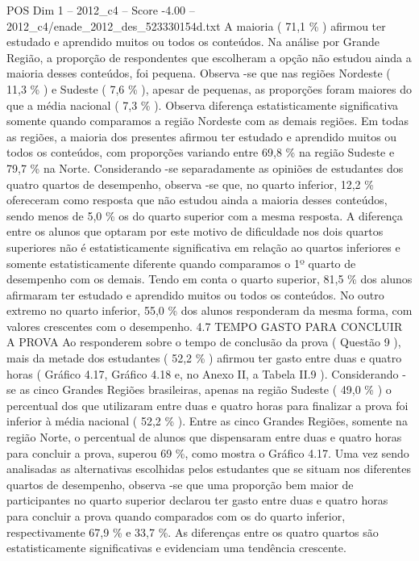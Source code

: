 \begin{textsample}{POS Dim 1 – 2012\_c4 – Score -4.00 – 2012\_c4/enade\_2012\_des\_523330154d.txt}
A maioria ( 71,1 \% ) afirmou ter estudado e aprendido muitos ou todos os conteúdos.
Na análise por Grande Região, a proporção de respondentes que escolheram a opção não estudou ainda a maioria desses conteúdos, foi pequena.
Observa -se que nas regiões Nordeste ( 11,3 \% ) e Sudeste ( 7,6 \% ), apesar de pequenas, as proporções foram maiores do que a média nacional ( 7,3 \% ).
Observa diferença estatisticamente significativa somente quando comparamos a região Nordeste com as demais regiões.
Em todas as regiões, a maioria dos presentes afirmou ter estudado e aprendido muitos ou todos os conteúdos, com proporções variando entre 69,8 \% na região Sudeste e 79,7 \% na Norte.
Considerando -se separadamente as opiniões de estudantes dos quatro quartos de desempenho, observa -se que, no quarto inferior, 12,2 \% ofereceram como resposta que não estudou ainda a maioria desses conteúdos, sendo menos de 5,0 \% os do quarto superior com a mesma resposta.
A diferença entre os alunos que optaram por este motivo de dificuldade nos dois quartos superiores não é estatisticamente significativa em relação ao quartos inferiores e somente estatisticamente diferente quando comparamos o 1º quarto de desempenho com os demais.
Tendo em conta o quarto superior, 81,5 \% dos alunos afirmaram ter estudado e aprendido muitos ou todos os conteúdos.
No outro extremo no quarto inferior, 55,0 \% dos alunos responderam da mesma forma, com valores crescentes com o desempenho. 4.7 TEMPO GASTO PARA CONCLUIR A PROVA Ao responderem sobre o tempo de conclusão da prova ( Questão 9 ), mais da metade dos estudantes ( 52,2 \% ) afirmou ter gasto entre duas e quatro horas ( Gráfico 4.17, Gráfico 4.18 e, no Anexo II, a Tabela II.9 ).
Considerando -se as cinco Grandes Regiões brasileiras, apenas na região Sudeste ( 49,0 \% ) o percentual dos que utilizaram entre duas e quatro horas para finalizar a prova foi inferior à média nacional ( 52,2 \% ).
Entre as cinco Grandes Regiões, somente na região Norte, o percentual de alunos que dispensaram entre duas e quatro horas para concluir a prova, superou 69 \%, como mostra o Gráfico 4.17.
Uma vez sendo analisadas as alternativas escolhidas pelos estudantes que se situam nos diferentes quartos de desempenho, observa -se que uma proporção bem maior de participantes no quarto superior declarou ter gasto entre duas e quatro horas para concluir a prova quando comparados com os do quarto inferior, respectivamente 67,9 \% e 33,7 \%.
As diferenças entre os quatro quartos são estatisticamente significativas e evidenciam uma tendência crescente.

\end{textsample}
